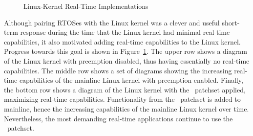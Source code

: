 \begin{figure}[p]
\centering
{}
\caption{Linux-Kernel Real-Time Implementations}
\label{fig:advsync:Linux-Kernel Real-Time Implementations}
\end{figure}

Although pairing RTOSes with the Linux kernel was a clever and useful
short-term response during the time that the Linux kernel had minimal
real-time capabilities, it also motivated adding real-time capabilities
to the Linux kernel.
Progress towards this goal is shown in
Figure~\ref{fig:advsync:Linux-Kernel Real-Time Implementations}.
The upper row shows a diagram of the Linux kernel with preemption disabled,
thus having essentially no real-time capabilities.
The middle row shows a set of diagrams showing the increasing real-time
capabilities of the mainline Linux kernel with preemption enabled.
Finally, the bottom row shows a diagram of the Linux kernel with the
\rt\ patchset applied, maximizing real-time capabilities.
Functionality from the \rt\ patchset is added to mainline,
hence the increasing capabilities of the mainline Linux kernel over time.
Nevertheless, the most demanding real-time applications continue to use
the \rt\ patchset.

